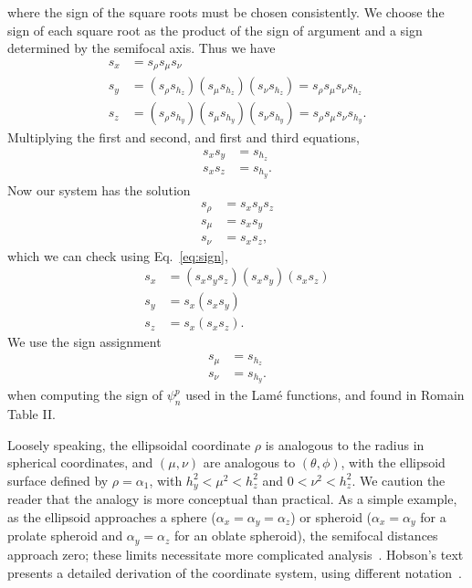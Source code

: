 where the sign of the square roots must be chosen consistently. We choose the sign of each square root as the product of
the sign of argument and a sign determined by the semifocal axis. Thus we have
\begin{align}\label{eq:sign}
  s_x &= s_\rho s_\mu s_\nu \\
  s_y &= (s_\rho s_{h_z}) (s_\mu s_{h_z}) (s_\nu s_{h_z}) = s_\rho s_\mu s_\nu s_{h_z} \\
  s_z &= (s_\rho s_{h_y}) (s_\mu s_{h_y}) (s_\nu s_{h_y}) = s_\rho s_\mu s_\nu s_{h_y}.
\end{align}
Multiplying the first and second, and first and third equations,
\begin{align}
  s_x s_y &= s_{h_z} \\
  s_x s_z &= s_{h_y}.
\end{align}
Now our system has the solution
\begin{align}
  s_\rho &= s_x s_y s_z \\
  s_\mu  &= s_x s_y \\
  s_\nu  &= s_x s_z,
\end{align}
which we can check using Eq.~\ref{eq:sign},
\begin{align}\label{eq:sign}
  s_x &= (s_x s_y s_z) (s_x s_y) (s_x s_z) \\
  s_y &= s_x (s_x s_y) \\
  s_z &= s_x (s_x s_z).
\end{align}
We use the sign assignment
\begin{align}
  s_\mu &= s_{h_z} \\
  s_\nu &= s_{h_y}.
\end{align}
when computing the sign of $\psi^p_n$ used in the Lam\'e functions, and found in Romain Table II.

Loosely speaking, the ellipsoidal coordinate $\rho$ is analogous to
the radius in spherical coordinates, and $(\mu,\nu)$ are analogous to
$(\theta, \phi)$, with the ellipsoid surface defined by $\rho =
\alpha_1$, with $h_y^2 < \mu^2 < h_z^2$ and $0 < \nu^2 < h_z^2$.  We
caution the reader that the analogy is more conceptual than practical.
As a simple example, as the ellipsoid approaches a sphere
($\alpha_x=\alpha_y=\alpha_z$) or spheroid ($\alpha_x=\alpha_y$ for a
prolate spheroid and $\alpha_y=\alpha_z$ for an oblate spheroid), the
semifocal distances approach zero; these limits necessitate more
complicated analysis~\cite{Hobson31,Ritter,Dassios03}.  Hobson's text
presents a detailed derivation of the coordinate system, using
different notation~\cite{Hobson31}.

